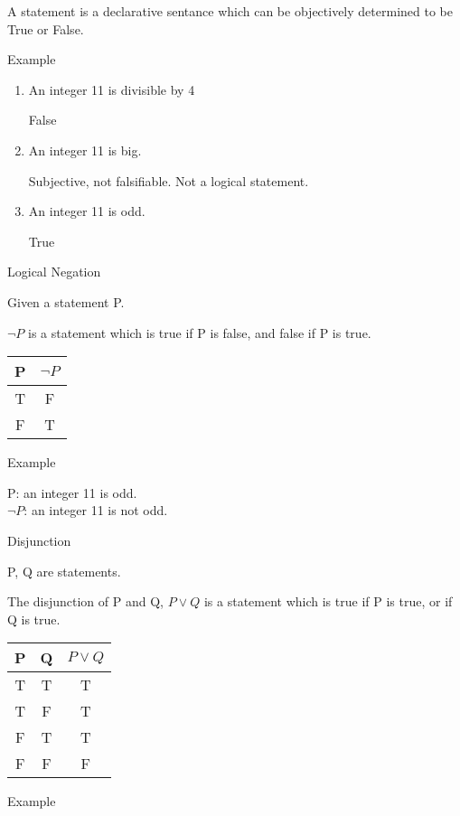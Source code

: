 \documentclass{report}
\begin{document}
\begin{mdframed}
    A statement is a declarative sentance which
    can be objectively determined to be True or False.
\end{mdframed}
\begin{description}
    \item Example

        \begin{enumerate}
            \item An integer 11 is divisible by 4

                False

            \item An integer 11 is big.

                Subjective, not falsifiable.
                Not a logical statement.

            \item An integer 11 is odd.

                True
        \end{enumerate}

    \item Logical Negation

        Given a statement P.

        $\neg P$ is a statement which is true if P is false,
        and false if P is true.

        \begin{tabular}{|c|c|}
            \hline
            P & $\neg P$\\
            \hline
            T & F\\
            \hline
            F & T\\
            \hline
        \end{tabular}

    \item Example

        P: an integer 11 is odd.\\
        $\neg P$: an integer 11 is not odd.

    \item Disjunction

        P, Q are statements.

        The disjunction of P and Q, $P \lor Q$
        is a statement which is true if P is true, or
        if Q is true.

        \begin{tabular}{|c|c|c|}
            \hline
            P & Q & $P \lor Q$\\ 
            \hline
            T & T & T\\
            \hline
            T & F & T\\
            \hline
            F & T & T\\
            \hline
            F & F & F\\
            \hline
        \end{tabular}
    \item Example


\end{description}
\end{document}

